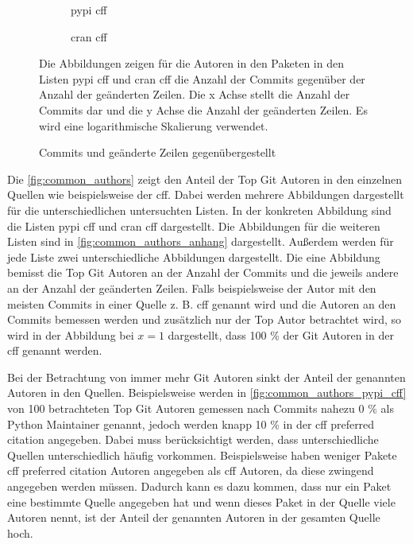 \begin{figure}
    \begin{subfigure}{.5\textwidth}
        \centering
        
        \caption{\gls{pypi} \gls{cff}}
        \label{fig:commits_vs_changed_lines_pypi_cff}
    \end{subfigure}%
    \begin{subfigure}{.5\textwidth}
        \centering
        
        \caption{\gls{cran} \gls{cff}}
        \label{fig:commits_vs_changed_lines_cran_cff}
    \end{subfigure}
    \caption{Commits und geänderte Zeilen gegenübergestellt}
    \label{fig:commits_vs_changed_lines}
    \small
    \raggedright
    Die Abbildungen zeigen für die Autoren in den Paketen in den Listen \gls{pypi} \gls{cff} und \gls{cran} \gls{cff} die Anzahl der Commits gegenüber der Anzahl der geänderten Zeilen. Die x Achse stellt die Anzahl der Commits dar und die y Achse die Anzahl der geänderten Zeilen. Es wird eine logarithmische Skalierung verwendet.
\end{figure}

Die \autoref{fig:common_authors} zeigt den Anteil der Top Git Autoren in den einzelnen Quellen wie beispielsweise der \gls{cff}.
Dabei werden mehrere Abbildungen dargestellt für die unterschiedlichen untersuchten Listen.
In der konkreten Abbildung sind die Listen \gls{pypi} \gls{cff} und \gls{cran} \gls{cff} dargestellt.
Die Abbildungen für die weiteren Listen sind in \autoref{fig:common_authors_anhang} dargestellt.
Außerdem werden für jede Liste zwei unterschiedliche Abbildungen dargestellt.
Die eine Abbildung bemisst die Top Git Autoren an der Anzahl der Commits und die jeweils andere an der Anzahl der geänderten Zeilen.
Falls beispielsweise der Autor mit den meisten Commits in einer Quelle z. B. \gls{cff} genannt wird und die Autoren an den Commits bemessen werden und zusätzlich nur der Top Autor betrachtet wird, so wird in der Abbildung bei $x=1$ dargestellt, dass 100 \% der Git Autoren in der \gls{cff} genannt werden.

Bei der Betrachtung von immer mehr Git Autoren sinkt der Anteil der genannten Autoren in den Quellen.
Beispielsweise werden in \autoref{fig:common_authors_pypi_cff} von 100 betrachteten Top Git Autoren gemessen nach Commits nahezu 0 \% als Python Maintainer genannt, jedoch werden knapp 10 \% in der \gls{cff} preferred citation angegeben.
Dabei muss berücksichtigt werden, dass unterschiedliche Quellen unterschiedlich häufig vorkommen.
Beispielsweise haben weniger Pakete \gls{cff} preferred citation Autoren angegeben als \gls{cff} Autoren, da diese zwingend angegeben werden müssen.
Dadurch kann es dazu kommen, dass nur ein Paket eine bestimmte Quelle angegeben hat und wenn dieses Paket in der Quelle viele Autoren nennt, ist der Anteil der genannten Autoren in der gesamten Quelle hoch.


